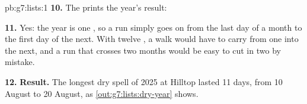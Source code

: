 \begin{solution}{pb:g7:lists:1}
\textbf{10.} The  prints the year's result:

\label{out:g7:lists:dry-year}

\textbf{11.} Yes: the year is one , so a run simply goes on from the last
day of a month to the first day of the next. With twelve , a walk would
have to carry  from one  into the next, and a run that crosses
two months would be easy to cut in two by mistake.

\textbf{12.} \textbf{Result.} The longest dry spell of 2025 at Hilltop lasted
11 days, from 10 August to 20 August, as \cref{out:g7:lists:dry-year} shows.
\end{solution}

